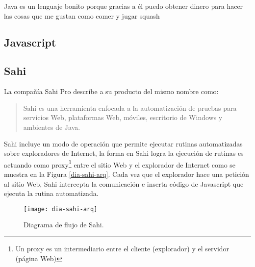 Java es un lenguaje bonito porque gracias a él  puedo obtener dinero para hacer las cosas que me gustan como comer  y jugar squash

\subsection{Javascript}\label{sec-javascript}
\fi


\subsection{Sahi}\label{sec-sahi}
La compañía Sahi Pro\textsuperscript{\textcopyright} describe a su producto del mismo nombre como:
\begin{quote}
	Sahi es una herramienta enfocada a la automatización de pruebas para servicios Web, plataformas Web, móviles, escritorio de Windows\textsuperscript{\textcopyright} y ambientes de Java\cite{SahiPro}.
\end{quote}

Sahi incluye un modo de operación que permite ejecutar rutinas automatizadas sobre exploradores de Internet, la forma en Sahi logra la ejecución de rutinas es actuando como proxy\footnote{Un proxy es un intermediario entre el cliente (explorador) y el servidor (página Web)\cite{BeginningUbuntuLinux}} entre el sitio Web y el explorador de Internet como se muestra en la Figura \ref{dia-sahi-arq}. Cada vez que el explorador hace una petición al sitio Web, Sahi intercepta la comunicación e inserta código de Javascript que ejecuta la rutina automatizada.\cite{WebEng9IntConf, SahiPro}

\begin{figure}[h]
\centering
\texttt{[image: dia-sahi-arq]}
\caption{Diagrama de flujo de Sahi\cite{SahiPro}.}
\label{fig:dia-sahi-arq}
\end{figure}

